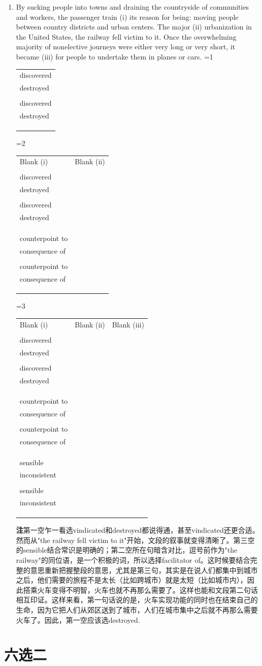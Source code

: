 \documentclass[11pt,space]{ctexart}
\newcommand{\note}[1]{{\heiti\textbf{注\hspace{1em}}}#1.}
\newcommand{\choices}[5]{%
    \ifx\relax#4\relax %
        \begin{tabular}{|>{\centering\arraybackslash}m{0.7\linewidth}|}
        \hline
        #1 \\ 
        \hline
        #2 \\ 
        \hline
        #3 \\
        \hline 
        \end{tabular}
    \else %
        \begin{tabular}{|>{\centering\arraybackslash}m{0.4\linewidth}|}
        \hline
        #1 \\ 
        \hline
        #2 \\ 
        \hline
        #3 \\
        \hline 
        #4 \\ 
        \hline
        #5 \\
        \hline 
        \end{tabular}
    \fi
}
\newcommand{\multiblank}[4]{%
    \ifnum#1=1
        \begin{center}
            \begin{tabularx}{0.4\textwidth}{*{1}{>{\centering\arraybackslash}X}}
            {#2}
            \end{tabularx}
        \end{center}
    \else
        \ifnum#1=2 %
            \begin{center}
                \begin{tabularx}{0.4\textwidth}{*{2}{>{\centering\arraybackslash}X}}
                Blank (i) & Blank (ii) \\
                {#2} & {#3}
                \end{tabularx}
            \end{center}
        \else %
            \ifnum#1=3
                \begin{center}
                    \begin{tabularx}{0.4\textwidth}{*{3}{>{\centering\arraybackslash}X}}
                    Blank (i) & Blank (ii) & Blank (iii) \\
                    {#2} & {#3} & {#4}
                    \end{tabularx}
                \end{center}
            \fi
        \fi
    \fi
}
\begin{document}
\begin{enumerate}
\item By sucking people into towns and draining the countryside of communities and workers, the passenger train (i)\blank{} its reason for being: moving people between country districts and urban centers. The major (ii)\blank{} urbanization in the United States, the railway fell victim to it. Once the overwhelming majority of nonelective journeys were either very long or very short, it became (iii)\blank{} for people to undertake them in planes or cars.
\multiblank{3}{\choices{vindicated}{discovered}{destroyed}{}{}}{\choices{facilitator of}{counterpoint to}{consequence of}{}{}}{\choices{unusual}{sensible}{inconsistent}{}{}}
\note{第一空乍一看选vindicated和destroyed都说得通，甚至vindicated还更合适。然而从"the railway fell victim to it"开始，文段的叙事就变得清晰了。第三空的sensible结合常识是明确的；第二空所在句暗含对比，逗号前作为"the railway"的同位语，是一个积极的词，所以选择facilitator of。这时候要结合完整的意思重新把握整段的意思，尤其是第三句，其实是在说人们都集中到城市之后，他们需要的旅程不是太长（比如跨城市）就是太短（比如城市内），因此搭乘火车变得不明智，火车也就不再那么需要了。这样也能和文段第二句话相互印证。这样来看，第一句话说的是，火车实现功能的同时也在结束自己的生命，因为它把人们从郊区送到了城市，人们在城市集中之后就不再那么需要火车了。因此，第一空应该选destroyed}

\end{enumerate}
\section*{六选二}
\end{document}
